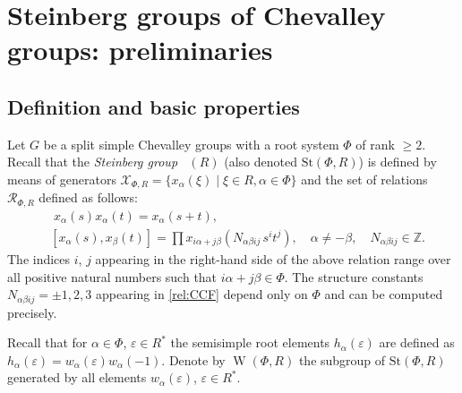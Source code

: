 \documentclass[oneside,12pt]{amsart}
\numberwithin{equation}{section}
\numberwithin{lem}{section}
\theoremstyle{definition}
\theoremstyle{remark}
\DeclareMathOperator{\St}{St^G}
\DeclareMathOperator{\WW}{W}
\newcommand{\Stb}{\mathrm{St}}
\begin{document}
\section{Steinberg groups of Chevalley groups: preliminaries}


\subsection{Definition and basic properties}
Let $G$ be a split simple Chevalley groups with a root system $\Phi$ of rank $\geq 2$.
Recall that the \emph{Steinberg group} $\St(R)$ (also denoted $\Stb(\Phi, R)$) is defined by means of generators 
$\mathcal{X}_{\Phi, R} = \{x_{\alpha}(\xi) \mid \xi\in R, \alpha\in\Phi\}$ and the set of relations $\mathcal{R}_{\Phi, R}$ defined as follows:
\begin{align}
& \phantom{[}
x_\alpha(s) x_\alpha(t) = x_\alpha(s+t), \label{rel:add}\\
& [x_\alpha(s), x_\beta(t)] = \prod x_{i\alpha + j\beta}\left(N_{\alpha\beta ij}\, s^i t^j\right), \quad \alpha\neq-\beta, \quad N_{\alpha\beta ij}\in\mathbb{Z}. \label{rel:CCF}
\end{align} 
The indices $i$, $j$ appearing in the right-hand side of the above relation range over all positive natural numbers such that $i\alpha + j\beta\in\Phi$.
The structure constants $N_{\alpha \beta i j}=\pm 1,2,3$ appearing in \eqref{rel:CCF} depend only on $\Phi$ and can be computed precisely.

Recall that for $\alpha\in\Phi$, $\varepsilon\in R^*$ the semisimple root elements $h_\alpha(\varepsilon)$ are defined as $h_\alpha(\varepsilon)=w_\alpha(\varepsilon)w_\alpha(-1)$.
Denote by $\WW(\Phi, R)$ the subgroup of $\Stb(\Phi, R)$ generated by all elements $w_\alpha(\varepsilon)$, $\varepsilon\in R^*$.

\end{document}
